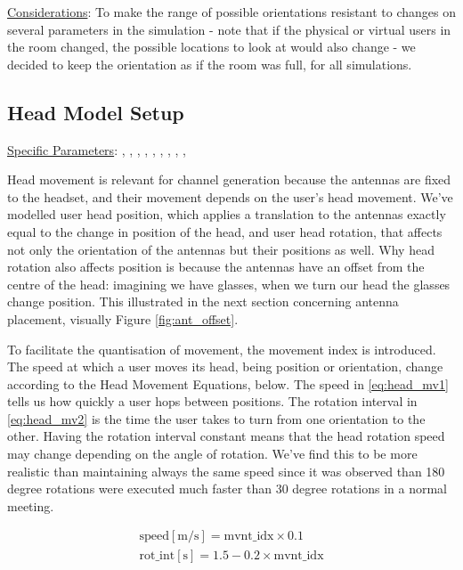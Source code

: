 \ul{Considerations}:
To make the range of possible orientations resistant to changes on several parameters in the simulation - note that if the physical or virtual users in the room changed, the possible locations to look at would also change - we decided to keep the orientation as if the room was full, for all simulations. 


\subsection*{Head Model Setup}

\ul{Specific Parameters}: \hspace{-0.3cm} 
, , , , , , , , , 


Head movement is relevant for channel generation because the antennas are fixed to the headset, and their movement depends on the user's head movement. We've modelled user head position, which applies a translation to the antennas exactly equal to the change in position of the head, and user head rotation, that affects not only the orientation of the antennas but their positions as well. Why head rotation also affects position is because the antennas have an offset from the centre of the head: imagining we have glasses, when we turn our head the glasses change position. This illustrated in the next section concerning antenna placement, visually Figure \ref{fig:ant_offset}.


To facilitate the quantisation of movement, the movement index is introduced. The speed at which a user moves its head, being position or orientation, change according to the Head Movement Equations, below. The speed in \ref{eq:head_mv1} tells us how quickly a user hops between positions. The rotation interval in \ref{eq:head_mv2} is the time the user takes to turn from one orientation to the other. Having the rotation interval constant means that the head rotation speed may change depending on the angle of rotation. We've find this to be more realistic than maintaining always the same speed since it was observed than 180 degree rotations were executed much faster than 30 degree rotations in a normal meeting.

\begin{gather} 
    \text{speed} [\text{m/s}] = \text{mvnt\_idx} \times 0.1 \label{eq:head_mv1} \\
    \text{rot\_int} [\text{s}]= 1.5 - 0.2 \times \text{mvnt\_idx} \label{eq:head_mv2}
\end{gather}

